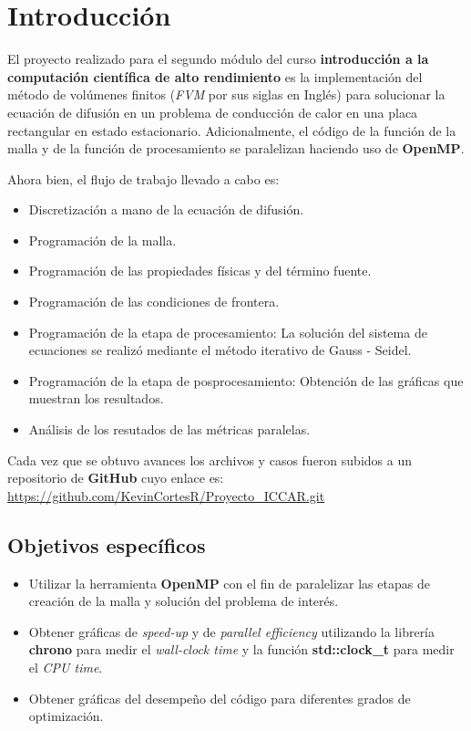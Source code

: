 \documentclass[article,latterpaper]{article}
\begin{document}
\newpage
{}

\section{Introducción}
El proyecto realizado para el segundo módulo del curso \textbf{introducción a la computación científica de alto rendimiento} es la implementación del método de volúmenes finitos (\textit{FVM} por sus siglas en Inglés) para solucionar la ecuación de difusión en un problema de conducción de calor en una placa rectangular en estado estacionario. Adicionalmente, el código de la función de la malla y de la función de procesamiento se paralelizan haciendo uso de \textbf{OpenMP}.

Ahora bien, el flujo de trabajo llevado a cabo es:

\begin{itemize}
	\item Discretización a mano de la ecuación de difusión.
	\item Programación de la malla.
	\item Programación de las propiedades físicas y del término fuente.
	\item Programación de las condiciones de frontera.
	\item Programación de la etapa de procesamiento: La solución del sistema de ecuaciones se realizó mediante el método iterativo de Gauss - Seidel.
	\item Programación de la etapa de posprocesamiento: Obtención de las gráficas que muestran los resultados.
        \item Análisis de los resutados de las métricas paralelas.
\end{itemize}

Cada vez que se obtuvo avances los archivos y casos fueron subidos a un repositorio de \textbf{GitHub} cuyo enlace es: \url{https://github.com/KevinCortesR/Proyecto_ICCAR.git}

\subsection{Objetivos específicos}
    \begin{itemize}
        \item Utilizar la herramienta \textbf{OpenMP} con el fin de paralelizar las etapas de creación de la malla y solución del problema de interés.
        \item Obtener gráficas de \textit{speed-up} y de \textit{parallel efficiency} utilizando la librería \textbf{chrono} para medir el \textit{wall-clock time} y la función \textbf{std::clock\_t} para medir el \textit{CPU time}.
        \item Obtener gráficas del desempeño del código para diferentes grados de optimización.
    \end{itemize}
\end{document}
